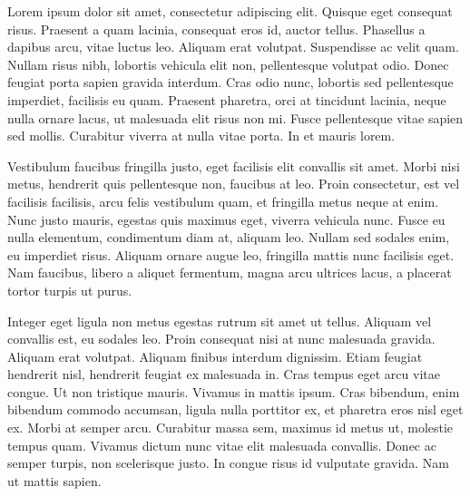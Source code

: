 Lorem ipsum dolor sit amet, consectetur adipiscing elit. Quisque eget consequat risus. Praesent a quam lacinia, consequat eros id, auctor tellus. Phasellus a dapibus arcu, vitae luctus leo. Aliquam erat volutpat. Suspendisse ac velit quam. Nullam risus nibh, lobortis vehicula elit non, pellentesque volutpat odio. Donec feugiat porta sapien gravida interdum. Cras odio nunc, lobortis sed pellentesque imperdiet, facilisis eu quam. Praesent pharetra, orci at tincidunt lacinia, neque nulla ornare lacus, ut malesuada elit risus non mi. Fusce pellentesque vitae sapien sed mollis. Curabitur viverra at nulla vitae porta. In et mauris lorem.

Vestibulum faucibus fringilla justo, eget facilisis elit convallis sit amet. Morbi nisi metus, hendrerit quis pellentesque non, faucibus at leo. Proin consectetur, est vel facilisis facilisis, arcu felis vestibulum quam, et fringilla metus neque at enim. Nunc justo mauris, egestas quis maximus eget, viverra vehicula nunc. Fusce eu nulla elementum, condimentum diam at, aliquam leo. Nullam sed sodales enim, eu imperdiet risus. Aliquam ornare augue leo, fringilla mattis nunc facilisis eget. Nam faucibus, libero a aliquet fermentum, magna arcu ultrices lacus, a placerat tortor turpis ut purus.

Integer eget ligula non metus egestas rutrum sit amet ut tellus. Aliquam vel convallis est, eu sodales leo. Proin consequat nisi at nunc malesuada gravida. Aliquam erat volutpat. Aliquam finibus interdum dignissim. Etiam feugiat hendrerit nisl, hendrerit feugiat ex malesuada in. Cras tempus eget arcu vitae congue. Ut non tristique mauris. Vivamus in mattis ipsum. Cras bibendum, enim bibendum commodo accumsan, ligula nulla porttitor ex, et pharetra eros nisl eget ex. Morbi at semper arcu. Curabitur massa sem, maximus id metus ut, molestie tempus quam. Vivamus dictum nunc vitae elit malesuada convallis. Donec ac semper turpis, non scelerisque justo. In congue risus id vulputate gravida. Nam ut mattis sapien.